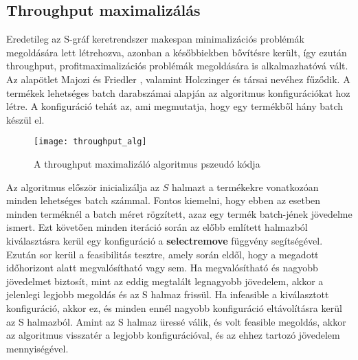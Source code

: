 \subsection{Throughput maximalizálás}
Eredetileg az S-gráf keretrendszer makespan minimalizációs problémák megoldására lett létrehozva, azonban a későbbiekben bővítésre került, így ezután throughput, profitmaximalizációs problémák megoldására is alkalmazhatóvá vált. Az alapötlet Majozi és Friedler \cite{majozifriedler}, valamint Holczinger és társai \cite{holczinger} nevéhez fűződik. A termékek lehetséges batch darabszámai alapján az algoritmus konfigurációkat hoz létre. A konfiguráció tehát az, ami megmutatja, hogy egy termékből hány batch készül el.
\begin{figure}[H]
\begin{center}
\texttt{[image: throughput\_alg]}
\caption{A throughput maximalizáló algoritmus pszeudó kódja \cite{Hegyhati}}
\label{throughput_alg}
\end{center}
\end{figure}
Az algoritmus először inicializálja az $S$ halmazt a termékekre vonatkozóan minden lehetséges batch számmal. Fontos kiemelni, hogy ebben az esetben minden terméknél a batch méret rögzített, azaz egy termék batch-jének jövedelme ismert. Ezt követően minden iteráció során az előbb említett halmazból kiválasztásra kerül egy konfiguráció a \textbf{select\textunderscore remove} függvény segítségével. Ezután sor kerül a feasibilitás tesztre, amely során eldől, hogy a megadott időhorizont alatt megvalósítható vagy sem. Ha megvalósítható és nagyobb jövedelmet biztosít, mint az eddig megtalált legnagyobb jövedelem, akkor a jelenlegi legjobb megoldás és az S halmaz frissül. Ha infeasible a kiválasztott konfiguráció, akkor ez, és minden ennél nagyobb konfiguráció eltávolításra kerül az S halmazból. Amint az S halmaz üressé válik, és volt feasible megoldás, akkor az algoritmus visszatér a legjobb konfigurációval, és az ehhez tartozó jövedelem mennyiségével.

